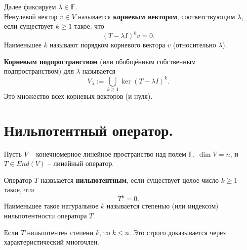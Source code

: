 \documentclass[14pt]{extreport}
\begin{document}
    \begin{defbox}
        Далее фиксируем $\lambda \in \mathbb{F}$.\\
        Ненулевой вектор $v \in V$ называется \textbf{корневым вектором}, соответствующим $\lambda$, если существует $k \geq 1$ такое, что
        \[
        (T - \lambda I)^kv = 0.
        \]
        Наименьшее $k$ называют порядком корневого вектора $v$ (относительно $\lambda$).

        \textbf{Корневым подпространством} (или обобщённым собственным подпространством) для $\lambda$ называется
        \[
        V_{\lambda} := \bigcup_{k \geq 1} \ker(T - \lambda I)^k.
        \]
        Это множество всех корневых векторов (и нуля).
    \end{defbox}



    \chapter{Нильпотентный оператор.}

    \begin{defbox}
        Пусть $V$ – конечномерное линейное пространство над полем $\mathbb{F},\ \dim V = n$, и $T \in End(V)$ – линейный оператор.

        Оператор $T$ назвыается \textbf{нильпотентным}, если существует целое число $k \geq 1$ такое, что
        \[
        T^k = 0.
        \]
        Наименьшее такое натуральное $k$ называется степенью (или индексом) нильпотентности оператора $T$.
    \end{defbox}
    \begin{impbox}
        Если $T$ нильпотентен степени $k$, то $k \leq n$. Это строго доказывается через характеристический многочлен.
    \end{impbox}
\end{document}
